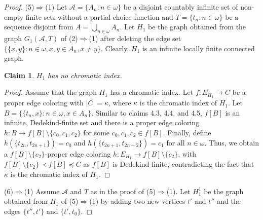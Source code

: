 \documentclass[12pt,reqno,a4paper]{amsart}
\theoremstyle{definition}
\newtheorem{claim}[defn]{Claim}
\begin{document}
\begin{proof}
		(5)$\Rightarrow$(1) 
		Let $\mathcal{A}=\{A_{n}:n\in \omega\}$ be a disjoint countably infinite set of non-empty finite sets without a partial choice function and $T=\{t_{n}:n\in \omega\}$ be a sequence 
		disjoint from $A=\bigcup_{n\in\omega}A_{n}$. 
		Let $H_1$ be the graph obtained from the graph $G_{1}(\mathcal{A},T)$ of (2)$\Rightarrow$(1) after deleting the edge set $\{\{x,y\}: n\in \omega, x,y\in A_n, x\neq y\}$. Clearly, $H_1$ is an infinite locally finite connected graph.
		
		\begin{claim}
			{\em $H_1$ has no chromatic index.}
		\end{claim}
		
		\begin{proof}
			Assume that the graph $H_{1}$ has a chromatic index. Let $f: E_{H_1}\to C$ be a proper edge coloring with $|C|=\kappa$, where $\kappa$ is the chromatic index of $H_1$. Let 
			$B = \{\{t_n,x\}: n\in \omega,  x\in A_n\}$.  
			Similar to claims 4.3, 4.4, and 4.5, $f[B]$ is an infinite, Dedekind-finite set and there is a proper 
			edge coloring $h: B \to f[B]\setminus\{c_0, c_1, c_2\}$  for some $c_0, c_1,c_2\in f[B]$. Finally, define $h(\{t_{2n}, t_{2n+1}\})= c_0$ and $h(\{t_{2n+1}, t_{2n+2}\})= c_1$ for all $n\in \omega$. Thus, we obtain a $f[B]\setminus\{c_2\}$-proper edge coloring $h:E_{H_1}\to f[B]\setminus\{c_2\}$, with 
			$f[B]\setminus\{c_2\} \prec f[B]\preceq C$ 
			as $f[B]$ is Dedekind-finite, contradicting the fact that $\kappa$ is the chromatic index of $H_1$.
		\end{proof}
		
		(6)$\Rightarrow$(1) Assume $\mathcal{A}$ and $T$ as in the proof of (5)$\Rightarrow$(1). Let $H_1^{1}$ be the graph obtained from $H_1$ of (5)$\Rightarrow$(1) by adding two new vertices $t'$ and $t''$ and the edges $\{t'', t'\}$ and $\{t', t_0\}$. 
		

\end{proof}
\end{document}
